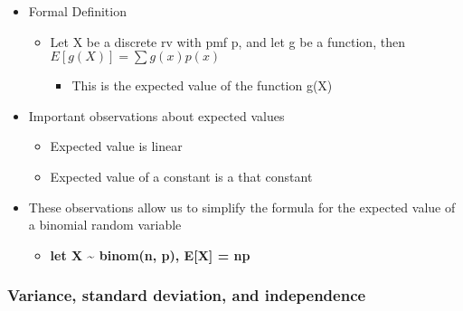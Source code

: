 \documentclass[
]{article}
\providecommand{\tightlist}{%
  \setlength{\itemsep}{0pt}\setlength{\parskip}{0pt}}
\begin{document}
\begin{itemize}
\tightlist
\item
  Formal Definition

  \begin{itemize}
  \tightlist
  \item
    Let X be a discrete rv with pmf p, and let g be a function, then
    \(E[g(X)] = \sum g(x)p(x)\)

    \begin{itemize}
    \tightlist
    \item
      This is the expected value of the function g(X)
    \end{itemize}
  \end{itemize}
\item
  Important observations about expected values

  \begin{itemize}
  \tightlist
  \item
    Expected value is linear
  \item
    Expected value of a constant is a that constant
  \end{itemize}
\item
  These observations allow us to simplify the formula for the expected
  value of a binomial random variable

  \begin{itemize}
  \tightlist
  \item
    \textbf{let X \textasciitilde{} binom(n, p), E{[}X{]} = np}
  \end{itemize}
\end{itemize}

\hypertarget{variance-standard-deviation-and-independence}{%
\subsubsection{Variance, standard deviation, and
independence}\label{variance-standard-deviation-and-independence}}
\end{document}
